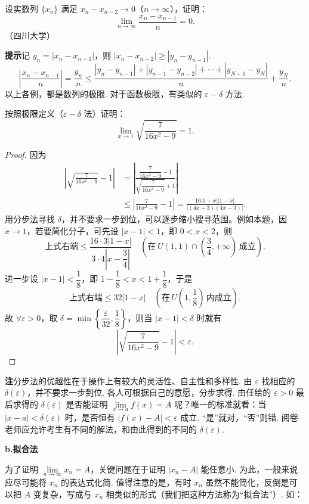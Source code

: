 \documentclass[UTF8, 12pt, fontset=fandol, oneside]{ctexart}
\begin{document}
设实数列 $\{x_n\}$ 满足 $x_n-x_{n-2}\to0$（$n\to\infty$），证明：
\[
  \lim_{n\to\infty}\frac{x_n-x_{n-1}}n=0.
\]
（四川大学）

\noindent\textbf{提示}\quad 记 $y_n=|x_n-x_{n-1}|$，则 $|x_n-x_{n-2}|\ge |y_n-y_{n-1}|$.
\[
  \left|\frac{x_n-x_{n-1}}n\right|
  =\frac{y_n}n
  \le \frac{|y_n-y_{n-1}|+|y_{n-1}-y_{n-2}|+\cdots+|y_{N+1}-y_N|}{n}
  +\frac{y_N}{n}.
\]
以上各例，都是数列的极限. 对于函数极限，有类似的 $\varepsilon-\delta$ 方法.


\begin{example}
按照极限定义（$\varepsilon-\delta$ 法）证明：
\[
  \lim_{x\to1}\sqrt{\frac7{16x^2-9}}=1.
\]

\begin{proof}
因为
\begin{align*}
\left|\sqrt{\frac7{16x^2-9}}-1\right|
&=\left|\frac{\dfrac7{16x^2-9}-1}{\sqrt{\dfrac7{16x^2-9}}+1}\right|\\
&\leqslant \left|\frac7{16x^2-9}-1\right|
=\frac{16|1+x||1-x|}{|(4x+3)(4x-3)|}.
\end{align*}
用分步法寻找 $\delta$，并不要求一步到位，可以逐步缩小搜寻范围。例如本题，因 $x\to1$，若要简化分子，可先设 $|x-1|<1$，即 $0<x<2$，则
\[
  \text{上式右端}\leqslant
  \frac{16\cdot3|1-x|}{3\cdot4\left|x-\dfrac34\right|}
  \quad\left(\text{在}\,U(1,1)\cap\left(\frac34,+\infty\right)\,\text{成立}\right).
\]
进一步设 $|x-1|<\dfrac18$，即 $1-\dfrac18<x<1+\dfrac18$，于是
\[
  \text{上式右端}\leqslant 32|1-x|\quad\left(\text{在}\,U\left(1,\frac18\right)\,\text{内成立}\right).
\]
故 $\forall\varepsilon>0$，取 $\delta=\min\left\{\dfrac\varepsilon{32},\dfrac18\right\}$，则当 $|x-1|<\delta$ 时就有
\[
  \left|\sqrt{\frac7{16x^2-9}}-1\right|<\varepsilon.
\]
\end{proof}
\end{example}


\noindent\textbf{注}\quad 分步法的优越性在于操作上有较大的灵活性、自主性和多样性. 由 $\varepsilon$ 找相应的 $\delta(\varepsilon)$，并不要求一步到位. 各人可根据自己的意愿，分步求得. 由任给的 $\varepsilon>0$ 最后求得的 $\delta(\varepsilon)$ 是否能证明 $\lim\limits_{x\to a}f(x)=A$ 呢？唯一的标准就看：当 $|x-a|<\delta(\varepsilon)$ 时，是否恒有 $|f(x)-A|<\varepsilon$ 成立. “是”就对，“否”则错. 阅卷老师应允许考生有不同的解法，和由此得到的不同的 $\delta(\varepsilon)$.

\noindent\textbf{b.\quad 拟合法}

为了证明 $\lim\limits_{n\to\infty}x_n=A$，关键问题在于证明 $|x_n-A|$ 能任意小. 为此，一般来说应尽可能将 $x_n$ 的表达式化简. 值得注意的是，有时 $x_n$ 虽然不能简化，反倒是可以把 $A$ 变复杂，写成与 $x_n$ 相类似的形式（我们把这种方法称为“拟合法”）. 如：
\end{document}
